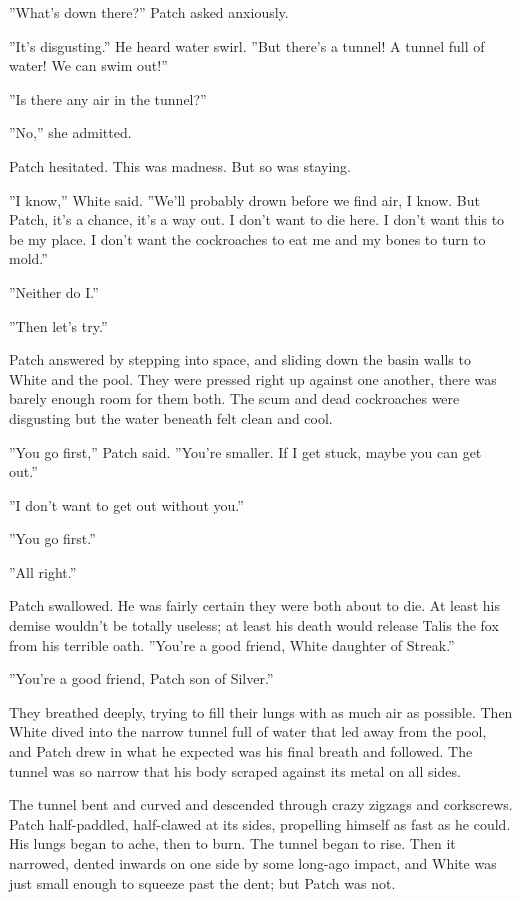 \documentclass[12pt]{book}
\begin{document}
''What's down there?'' Patch asked anxiously.

''It's disgusting.'' He heard water swirl. ''But there's a tunnel! A tunnel full of water! We can swim out!''

''Is there any air in the tunnel?''

''No,'' she admitted.

Patch hesitated. This was madness. But so was staying.

''I know,'' White said. ''We'll probably drown before we find air, I know. But Patch, it's a chance, it's a way out. I don't want to die here. I don't want this to be my place. I don't want the cockroaches to eat me and my bones to turn to mold.''

''Neither do I.''

''Then let's try.''

Patch answered by stepping into space, and sliding down the basin walls to White and the pool. They were pressed right up against one another, there was barely enough room for them both. The scum and dead cockroaches were disgusting %
but the water beneath felt clean and cool.

''You go first,'' Patch said. ''You're smaller. If I get stuck, maybe you can get out.''

''I don't want to get out without you.''

''You go first.''

''All right.''

Patch swallowed. He was fairly certain they were both about to die. At least his demise wouldn't be totally useless; at least his death would release Talis the fox from his terrible oath. ''You're a good friend, White daughter of Streak.''

''You're a good friend, Patch son of Silver.''

They breathed deeply, trying to fill their lungs with as much air as possible. Then White dived into the narrow tunnel full of water that led away from the pool, and Patch drew in what he expected was his final breath and followed. The tunnel was so narrow that his body scraped against its metal on all sides.

The tunnel bent and curved and descended through crazy zigzags and corkscrews. Patch half-paddled, half-clawed at its sides, propelling himself as fast as he could. His lungs began to ache, then to burn. The tunnel began to rise. Then it narrowed, dented inwards on one side by some long-ago impact, and White was just small enough to squeeze past the dent; but Patch was not.
\end{document}
